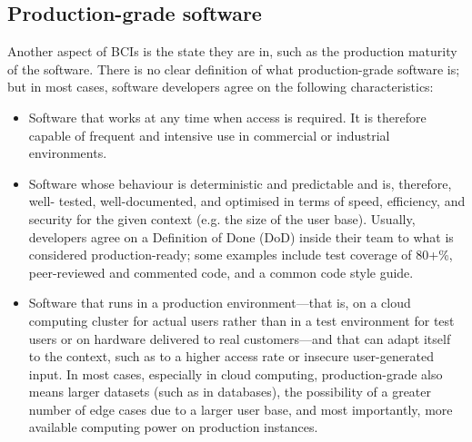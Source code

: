 \subsection{Production-grade software}
\label{chapter2-production-grade-software}

Another aspect of BCIs is the state they are in, such as the production maturity of the software. There is no clear definition of what production-grade software is; but in most cases, software developers agree on the following characteristics:

\begin{itemize}
  \item Software that works at any time when access is required. It is therefore capable of frequent and intensive use in commercial or industrial environments.
  \item Software whose behaviour is deterministic and predictable and is, therefore, well- tested, well-documented, and optimised in terms of speed, efficiency, and security for the given context (e.g. the size of the user base). Usually, developers agree on a Definition of Done (DoD) inside their team to what is considered production-ready; some examples include test coverage of 80+\%, peer-reviewed and commented code, and a common code style guide.
  \item Software that runs in a production environment—that is, on a cloud computing cluster for actual users rather than in a test environment for test users or on hardware delivered to real customers—and that can adapt itself to the context, such as to a higher access rate or insecure user-generated input. In most cases, especially in cloud computing, production-grade also means larger datasets (such as in databases), the possibility of a greater number of edge cases due to a larger user base, and most importantly, more available computing power on production instances.
\end{itemize}

